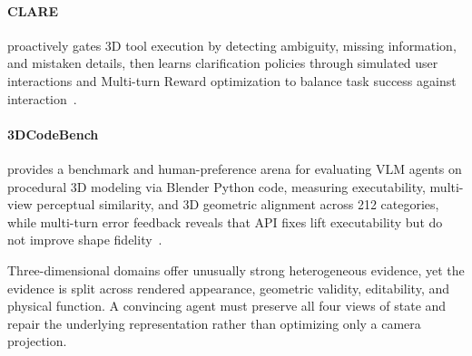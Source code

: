 \paragraph{CLARE} proactively gates 3D tool execution by detecting ambiguity, missing information, and mistaken details, then learns clarification policies through simulated user interactions and Multi-turn Reward optimization to balance task success against interaction~\cite{avg260716352}.


\paragraph{3DCodeBench} provides a benchmark and human-preference arena for evaluating VLM agents on procedural 3D modeling via Blender Python code, measuring executability, multi-view perceptual similarity, and 3D geometric alignment across 212 categories, while multi-turn error feedback reveals that API fixes lift executability but do not improve shape fidelity~\cite{avg260601057}.


Three-dimensional domains offer unusually strong heterogeneous evidence, yet the evidence is split across rendered appearance, geometric validity, editability, and physical function. A convincing agent must preserve all four views of state and repair the underlying representation rather than optimizing only a camera projection.

\FloatBarrier
